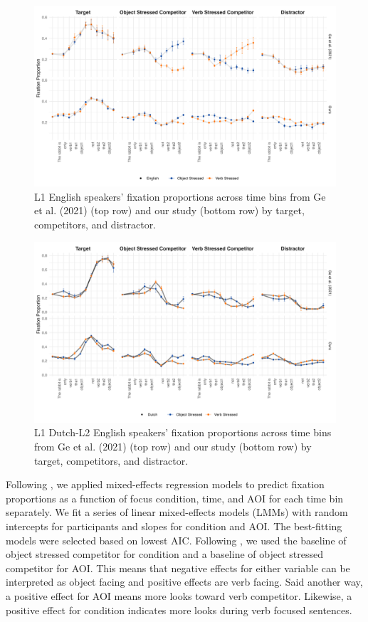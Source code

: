 \begin{figure}[H]  %
    \centering
    \includegraphics[width=\textwidth,height=\textheight,keepaspectratio]{viz/english_fix.png}
    \caption{L1 English speakers' fixation proportions across time bins from Ge et al. (2021) (top row) and our study (bottom row) by target, competitors, and distractor.}
    \label{fig:english_fix}
\end{figure}

\begin{figure}  %
    \centering
    \includegraphics[width=\textwidth,height=\textheight,keepaspectratio]{viz/dutch_fix.png}
    \caption{L1 Dutch-L2 English speakers' fixation proportions across time bins from Ge et al. (2021) (top row) and our study (bottom row) by target, competitors, and distractor.}
    \label{fig:dutch_fix}
\end{figure}

Following \cite{Ge2021}, we applied mixed-effects regression models to predict fixation proportions as a function of focus condition, time, and AOI for each time bin separately. We fit a series of linear mixed-effects models (LMMs) with random intercepts for participants and slopes for condition and AOI. The best-fitting models were selected based on lowest AIC. Following \cite{Ge2021}, we used the baseline of object stressed competitor for condition and a baseline of object stressed competitor for AOI. This means that negative effects for either variable can be interpreted as object facing and positive effects are verb facing. Said another way, a positive effect for AOI means more looks toward verb competitor. Likewise, a positive effect for condition indicates more looks during verb focused sentences.

